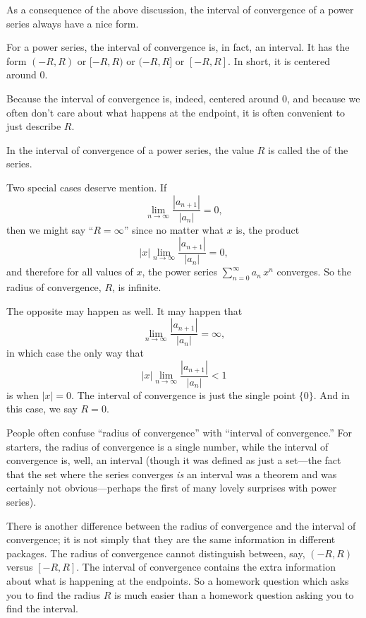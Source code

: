 As a consequence of the above discussion, the interval of convergence
of a power series always have a nice form.

\begin{theorem}
  \label{thm:convergence-set-is-interval}
  For a power series, the interval of convergence is, in fact, an
  interval.  It has the form $(-R,R)$ or $[-R,R)$ or $(-R,R]$ or
  $[-R,R]$.  In short, it is centered around $0$.
\end{theorem}

Because the interval of convergence is, indeed, centered around $0$,
and because we often don't care about what happens at the endpoint, it
is often convenient to just describe $R$.

\begin{definition}
  \label{definition:radius-of-convergence}
  In the interval of convergence of a power series, the value $R$ is called
  the  of the series.
\end{definition}

Two special cases deserve mention.  If
$$
\lim_{n\to\infty} \frac{|a_{n+1}|}{|a_n|} = 0,
$$
then we might say ``$R = \infty$'' since no matter what $x$ is, the product
$$
|x| \lim_{n\to\infty} \frac{|a_{n+1}|}{|a_n|} = 0,
$$
and therefore for all values of $x$, the power series
$\sum_{n=0}^\infty a_n \, x^n$ converges.  So the radius of
convergence, $R$, is infinite.

The opposite may happen as well.  It may happen that
$$
\lim_{n\to\infty} \frac{|a_{n+1}|}{|a_n|} = \infty,
$$
in which case the only way that 
$$
|x| \lim_{n\to\infty} \frac{|a_{n+1}|}{|a_n|} < 1
$$
is when $|x| = 0$.  The interval of convergence is just the single
point $\{0\}$.  And in this case, we say $R = 0$.

\begin{warning}
  People often confuse ``radius of convergence'' with ``interval of
  convergence.''  For starters, the radius of convergence is a single
  number, while the interval of convergence is, well, an interval
  (though it was defined as just a set---the fact that the set where
  the series converges \textit{is} an interval was a theorem and was
  certainly not obvious---perhaps the first of many lovely surprises
  with power series).

  There is another difference between the radius of convergence and
  the interval of convergence; it is not simply that they are the same
  information in different packages.  The radius of convergence cannot
  distinguish between, say, $(-R,R)$ versus $[-R,R]$.  The interval of
  convergence contains the extra information about what is happening
  at the endpoints.  So a homework question which asks you to find the
  radius $R$ is much easier than a homework question asking you to
  find the interval.
\end{warning}

